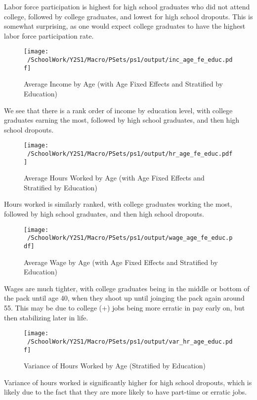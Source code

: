 \documentclass[12pt]{article}
\begin{document}
Labor force participation is highest for high school graduates who did not attend college, followed by college graduates, and lowest for high school dropouts.
This is somewhat surprising, as one would expect college graduates to have the highest labor force participation rate.

\begin{figure}[h!]
    \centering
    \texttt{[image: ~/SchoolWork/Y2S1/Macro/PSets/ps1/output/inc\_age\_fe\_educ.pdf]}
    \caption{Average Income by Age (with Age Fixed Effects and Stratified by Education)}
\end{figure}

We see that there is a rank order of income by education level, with college graduates earning the most, followed by high school graduates, and then high school dropouts.

\begin{figure}[h!]
    \centering
    \texttt{[image: ~/SchoolWork/Y2S1/Macro/PSets/ps1/output/hr\_age\_fe\_educ.pdf]}
    \caption{Average Hours Worked by Age (with Age Fixed Effects and Stratified by Education)}
\end{figure}

Hours worked is similarly ranked, with college graduates working the most, followed by high school graduates, and then high school dropouts.

\begin{figure}[h!]
    \centering
    \texttt{[image: ~/SchoolWork/Y2S1/Macro/PSets/ps1/output/wage\_age\_fe\_educ.pdf]}
    \caption{Average Wage by Age (with Age Fixed Effects and Stratified by Education)}
\end{figure} 

Wages are much tighter, with college graduates being in the middle or bottom of the pack until age 40, when they shoot up until joinging the pack again around 55.
  This may be due to college (+) jobs being more erratic in pay early on, but then stabilizing later in life.

\begin{figure}[h!]
    \centering
    \texttt{[image: ~/SchoolWork/Y2S1/Macro/PSets/ps1/output/var\_hr\_age\_educ.pdf]}
    \caption{Variance of Hours Worked by Age (Stratified by Education)}
\end{figure}

Variance of hours worked is significantly higher for high school dropouts, which is likely due to the fact that they are more likely to have part-time or erratic jobs.
\end{document}
